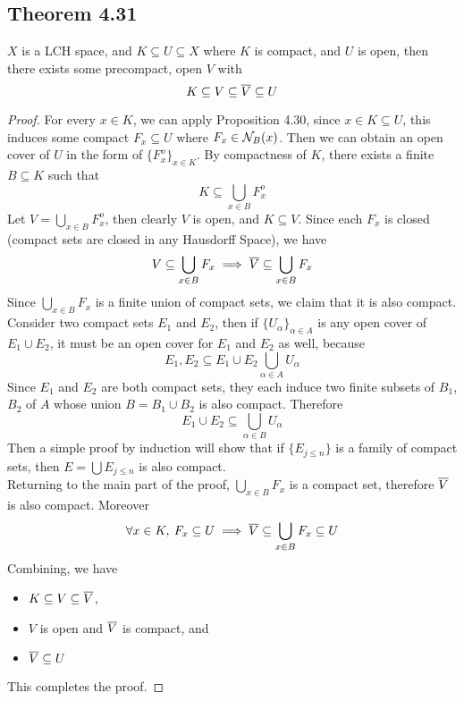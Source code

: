 \documentclass[../../main.tex]{subfiles}
\begin{document}
\subsection{Theorem 4.31}
\begin{wts}
    $X$ is a LCH space, and $K\subseteq U\subseteq X$ where $K$ is compact, and $U$ is open, then there exists some precompact, open $V$ with
    \[
    K\subseteq V\subseteq \overline{V}\subseteq U
    \]
\end{wts}
\begin{proof}
    For every $x\in K$, we can apply Proposition 4.30, since $x\in K\subseteq U$, this induces some compact $F_x\subseteq U$ where $F_x\in\mathcal{N}_B({x})$. Then we can obtain an open cover of $U$ in the form of $\{F_x^o\}_{x\in K}$. By compactness of $K$, there exists a finite $B\subseteq K$ such that 
    \[
    K\subseteq \bigcup_{x\in B} F_x^o
    \]
    Let $V = \bigcup_{x\in B}F_x^o$, then clearly $V$ is open, and $K\subseteq V$. Since each $F_x$ is closed (compact sets are closed in any Hausdorff Space), we have
    \[
    V\subseteq \bigcup_{x\in B}F_x\implies\overline{V}\subseteq\bigcup_{x\in B}F_x
    \]
    Since $\bigcup_{x\in B}F_x$ is a finite union of compact sets, we claim that it is also compact. Consider two compact sets $E_1$ and $E_2$, then if $\{U_\alpha\}_{\alpha\in A}$ is any open cover of $E_1\cup E_2$, it must be an open cover for $E_1$ and $E_2$ as well, because
    \[
    E_1,E_2\subseteq E_1\cup E_2 \bigcup_{\alpha\in A} U_\alpha
    \]
    Since $E_1$ and $E_2$ are both compact sets, they each induce two finite subsets of $B_1$, $B_2$ of $A$ whose union $B = B_1\cup B_2$ is also compact. Therefore
    \[
    E_1\cup E_2 \subseteq \bigcup_{\alpha\in B}U_\alpha
    \]
    Then a simple proof by induction will show that if $\{E_{j\leq n}\}$ is a family of compact sets, then $E = \bigcup E_{j\leq n}$ is also compact.\\
    
    Returning to the main part of the proof, $\bigcup_{x\in B}F_x$ is a compact set, therefore $\overline{V}$ is also compact. Moreover
    \[
    \forall x\in K,\: F_x\subseteq U\implies \overline{V}\subseteq\bigcup_{x\in B}F_x\subseteq U
    \]
    Combining, we have
    \begin{itemize}
        \item $K\subseteq V\subseteq \overline{V}$, 
        \item $V$ is open and $\overline{V}$ is compact, and
        \item $\overline{V}\subseteq U$
    \end{itemize}
    This completes the proof.
\end{proof}
\end{document}
